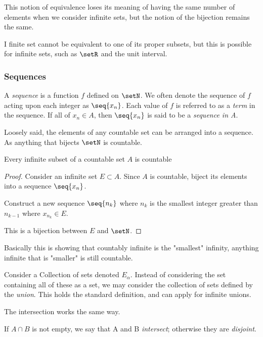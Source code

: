 \documentclass[12pt, letterpaper]{paper}
\begin{document}
This notion of equivalence loses its meaning of having the same number
of elements when we consider infinite sets, but the notion of the
bijection remains the same.

\vspace{ .33in }

I finite set cannot be equivalent to one of its proper subsets, but
this is possible for infinite sets, such as $\setR$ and the unit
interval.

\subsubsection{Sequences}
\label{sec:org5d64d89}
A \emph{sequence} is a function $f$ defined on $\setN$. We often
denote the sequence of $f$ acting upon each integer as
$\seq{x_{n}}$. Each value of $f$ is referred to as a \emph{term} in
the sequence. If all of $x_{n} \in A$, then $\seq{x_{n}}$ is said to
be a \emph{sequence in A}.

Loosely said, the elements of any countable set can be arranged into a
sequence. As anything that bijects $\setN$ is countable.

\begin{theorem}
  \label{thr:2.8}
  Every infinite subset of a countable set $A$ is countable
\end{theorem}
\begin{proof}
  Consider an infinite set $E \subset A$. Since $A$ is countable,
  biject its elements into a sequence $\seq{x_{n}}$.

  Construct a new sequence $\seq{n_k}$ where $n_k$ is the smallest
  integer greater than $n_{k-1}$ where $x_{n_k} \in E$.

  This is a bijection between $E$ and $\setN$.
\end{proof}

Basically this is showing that countably infinite is the "smallest"
infinity, anything infinite that is "smaller" is still countable.

\vspace{ .33in }

Consider a Collection of sets denoted $E_{\alpha}$. Instead of
considering the set containing all of these as a set, we may consider
the collection of sets defined by the \emph{union}. This holds the
standard definition, and can apply for infinite unions.

The intersection works the same way.

If $A \cap B$ is not empty, we say that A and B \emph{intersect};
otherwise they are \emph{disjoint}.
\end{document}
